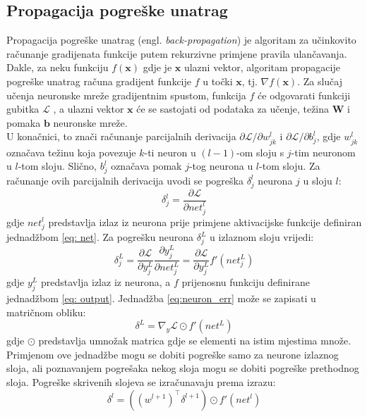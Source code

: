 \documentclass[times, utf8, zavrsni, numeric]{fer}
\renewcommand{\vec}[1]{\mathbf{#1}}
\begin{document}
\subsection{Propagacija pogreške unatrag}
Propagacija pogreške unatrag (engl. \textit{back-propagation}) je algoritam
za učinkovito računanje gradijenata funkcije putem rekurzivne primjene pravila
ulančavanja. Dakle, za neku funkciju $f(\vec{x})$ gdje je $\vec{x}$ ulazni vektor,
algoritam propagacije pogreške unatrag računa gradijent funkcije $f$ u 
točki $\vec{x}$, tj. $\nabla f(\vec{x})$. Za slučaj učenja neuronske mreže
gradijentnim spustom, funkcija $f$ će odgovarati funkciji gubitka $\mathcal{L}$
, a ulazni
vektor $\vec{x}$ će se sastojati od podataka za učenje, težina $\vec{W}$ i 
pomaka $\vec{b}$ neuronske mreže. 
\\\indent U konačnici, to znači računanje parcijalnih derivacija
$\partial \mathcal{L} / \partial w_{jk}^l$ i $\partial \mathcal{L} / \partial b_{j}^l$, gdje $w_{jk}^l$ označava težinu koja povezuje $k$-ti neuron u $(l-1)$-om
sloju s $j$-tim neuronom u $l$-tom sloju. Slično, $b_{j}^l$ označava pomak
$j$-tog neurona u $l$-tom sloju. Za računanje ovih parcijalnih derivacija
uvodi se pogreška $\delta_j^l$ neurona $j$ u sloju $l$:
\begin{equation}
	\delta_j^l = \frac{\partial \mathcal{L}}{\partial net_j^l}
\end{equation}
gdje $net_j^l$ predstavlja izlaz iz neurona prije primjene aktivacijske funkcije
definiran jednadžbom \ref{eq: net}. Za pogrešku neurona $\delta_j^L$
u izlaznom sloju vrijedi:
\begin{equation}
	\delta_j^L = \frac{\partial \mathcal{L}}{\partial y_j^L}
	\frac{\partial y_j^L}{\partial net_j^L} = 
	\frac{\partial \mathcal{L}}{\partial y_j^L} f'(net_j^L)
	\label{eq:neuron_err}
\end{equation}
gdje $y_j^L$ predstavlja izlaz iz neurona, a $f$ prijenosnu funkciju definirane
jednadžbom \ref{eq: output}. Jednadžba \ref{eq:neuron_err} može se zapisati
u matričnom obliku:
\begin{equation}
	\delta^L = \nabla_{y} \mathcal{L} \odot f'(net^L)
	\label{eq:neuron_err_mat}
\end{equation}
gdje $\odot$ predstavlja umnožak matrica gdje se elementi na istim mjestima
množe. Primjenom ove jednadžbe mogu se dobiti pogreške samo za neurone
izlaznog sloja, ali poznavanjem pogrešaka nekog sloja mogu se dobiti 
pogreške prethodnog sloja. Pogreške skrivenih slojeva se izračunavaju
prema izrazu:
\begin{equation}
	\delta^l = ((w^{l+1})^\top \delta^{l+1}) \odot f'(net^l)
	\label{eq:hid_neuron_err_mat}
\end{equation}
\end{document}
